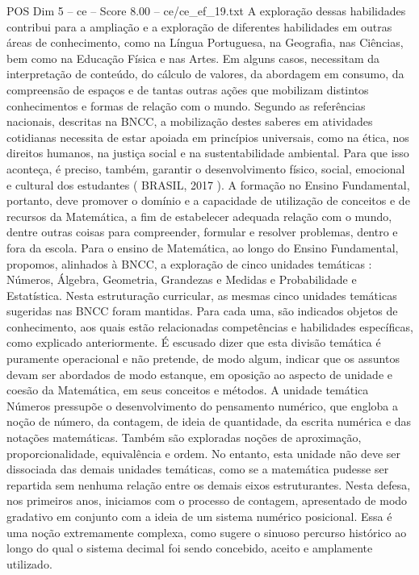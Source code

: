 \begin{textsample}{POS Dim 5 – ce – Score 8.00 – ce/ce\_ef\_19.txt}
A exploração dessas habilidades contribui para a ampliação e a exploração de diferentes habilidades em outras áreas de conhecimento, como na Língua Portuguesa, na Geografia, nas Ciências, bem como na Educação Física e nas Artes.
Em alguns casos, necessitam da interpretação de conteúdo, do cálculo de valores, da abordagem em consumo, da compreensão de espaços e de tantas outras ações que mobilizam distintos conhecimentos e formas de relação com o mundo.
Segundo as referências nacionais, descritas na BNCC, a mobilização destes saberes em atividades cotidianas necessita de estar apoiada em princípios universais, como na ética, nos direitos humanos, na justiça social e na sustentabilidade ambiental.
Para que isso aconteça, é preciso, também, garantir o desenvolvimento físico, social, emocional e cultural dos estudantes ( BRASIL, 2017 ).
A formação no Ensino Fundamental, portanto, deve promover o domínio e a capacidade de utilização de conceitos e de recursos da Matemática, a fim de estabelecer adequada relação com o mundo, dentre outras coisas para compreender, formular e resolver problemas, dentro e fora da escola.
Para o ensino de Matemática, ao longo do Ensino Fundamental, propomos, alinhados à BNCC, a exploração de cinco unidades temáticas : Números, Álgebra, Geometria, Grandezas e Medidas e Probabilidade e Estatística.
Nesta estruturação curricular, as mesmas cinco unidades temáticas sugeridas nas BNCC foram mantidas.
Para cada uma, são indicados objetos de conhecimento, aos quais estão relacionadas competências e habilidades específicas, como explicado anteriormente.
É escusado dizer que esta divisão temática é puramente operacional e não pretende, de modo algum, indicar que os assuntos devam ser abordados de modo estanque, em oposição ao aspecto de unidade e coesão da Matemática, em seus conceitos e métodos.
A unidade temática Números pressupõe o desenvolvimento do pensamento numérico, que engloba a noção de número, da contagem, de ideia de quantidade, da escrita numérica e das notações matemáticas.
Também são exploradas noções de aproximação, proporcionalidade, equivalência e ordem.
No entanto, esta unidade não deve ser dissociada das demais unidades temáticas, como se a matemática pudesse ser repartida sem nenhuma relação entre os demais eixos estruturantes.
Nesta defesa, nos primeiros anos, iniciamos com o processo de contagem, apresentado de modo gradativo em conjunto com a ideia de um sistema numérico posicional.
Essa é uma noção extremamente complexa, como sugere o sinuoso percurso histórico ao longo do qual o sistema decimal foi sendo concebido, aceito e amplamente utilizado.

\end{textsample}
